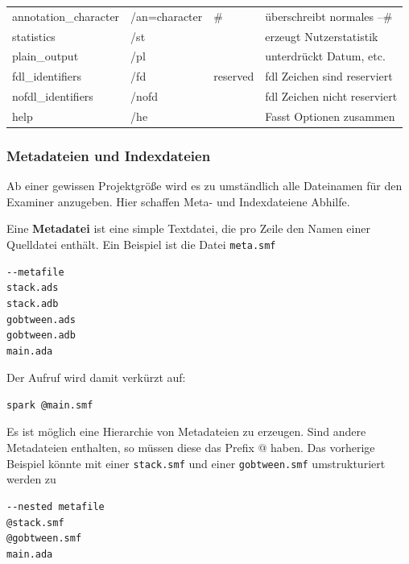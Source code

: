 \begin{footnotesize}
\begin{table}[h!]
\begin{tabular}{|l|l|l|l|}
annotation\_character & /an=character    & \#            & überschreibt normales --\#             \\
statistics            & /st              &               & erzeugt Nutzerstatistik                \\
plain\_output         & /pl              &               & unterdrückt Datum, etc. \\
fdl\_identifiers      & /fd              & reserved      & fdl Zeichen sind reserviert            \\
nofdl\_identifiers    & /nofd            &               & fdl Zeichen nicht reserviert           \\
help                  & /he              &               & Fasst Optionen zusammen                \\ \hline
\end{tabular}
\end{table}
\end{footnotesize}



\subsubsection{Metadateien und Indexdateien}
Ab einer gewissen Projektgröße wird es zu umständlich alle Dateinamen für den Examiner anzugeben. Hier schaffen Meta- und Indexdateiene Abhilfe.

Eine \textbf{Metadatei} ist eine simple Textdatei, die pro Zeile den Namen einer Quelldatei enthält. Ein Beispiel ist die Datei \texttt{meta.smf}

\begin{verbatim}
--metafile
stack.ads
stack.adb
gobtween.ads
gobtween.adb
main.ada
\end{verbatim}

Der Aufruf wird damit verkürzt auf:

\begin{verbatim}
spark @main.smf
\end{verbatim}

Es ist möglich eine Hierarchie von Metadateien zu erzeugen. Sind andere Metadateien enthalten, so müssen diese das Prefix @ haben. Das vorherige Beispiel könnte mit einer \texttt{stack.smf} und einer \texttt{gobtween.smf} umstrukturiert werden zu

\begin{verbatim}
--nested metafile
@stack.smf
@gobtween.smf
main.ada
\end{verbatim}

